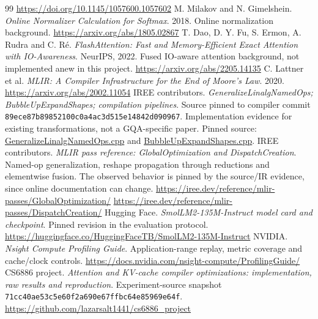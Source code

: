 \documentclass[10pt,a4paper]{article}
\newcommand{\code}[1]{\texttt{#1}}
\begin{document}
\begin{thebibliography}{99}
\url{https://doi.org/10.1145/1057600.1057602}
 M. Milakov and N. Gimelshein. \emph{Online Normalizer Calculation for Softmax}. 2018. Online normalization background.
\url{https://arxiv.org/abs/1805.02867}
 T. Dao, D. Y. Fu, S. Ermon, A. Rudra and C. R\'e. \emph{FlashAttention: Fast and Memory-Efficient Exact Attention with IO-Awareness}. NeurIPS, 2022. Fused IO-aware attention background, not implemented anew in this project.
\url{https://arxiv.org/abs/2205.14135}
 C. Lattner et al. \emph{MLIR: A Compiler Infrastructure for the End of Moore's Law}. 2020.
\url{https://arxiv.org/abs/2002.11054}
 IREE contributors. \emph{GeneralizeLinalgNamedOps; BubbleUpExpandShapes; compilation pipelines}. Source pinned to compiler commit \code{89ece87b89852100c0a4ac3d515e14842d090967}. Implementation evidence for existing transformations, not a GQA-specific paper.
Pinned source: \href{https://github.com/iree-org/iree/blob/89ece87b89852100c0a4ac3d515e14842d090967/compiler/src/iree/compiler/GlobalOptimization/GeneralizeLinalgNamedOps.cpp}{GeneralizeLinalgNamedOps.cpp} and \href{https://github.com/iree-org/iree/blob/89ece87b89852100c0a4ac3d515e14842d090967/compiler/src/iree/compiler/DispatchCreation/BubbleUpExpandShapes.cpp}{BubbleUpExpandShapes.cpp}.
 IREE contributors. \emph{MLIR pass reference: GlobalOptimization and DispatchCreation}. Named-op generalization, reshape propagation through reductions and elementwise fusion. The observed behavior is pinned by the source/IR evidence, since online documentation can change.
\url{https://iree.dev/reference/mlir-passes/GlobalOptimization/}
\url{https://iree.dev/reference/mlir-passes/DispatchCreation/}
 Hugging Face. \emph{SmolLM2-135M-Instruct model card and checkpoint}. Pinned revision in the evaluation protocol.
\url{https://huggingface.co/HuggingFaceTB/SmolLM2-135M-Instruct}
 NVIDIA. \emph{Nsight Compute Profiling Guide}. Application-range replay, metric coverage and cache/clock controls.
\url{https://docs.nvidia.com/nsight-compute/ProfilingGuide/}
 CS6886 project. \emph{Attention and KV-cache compiler optimizations: implementation, raw results and reproduction}. Experiment-source snapshot \code{71cc40ae53c5e60f2a690e67ffbc64e85969e64f}.
\url{https://github.com/lazarsalt1441/cs6886_project}
\end{thebibliography}
\endgroup
\end{document}
